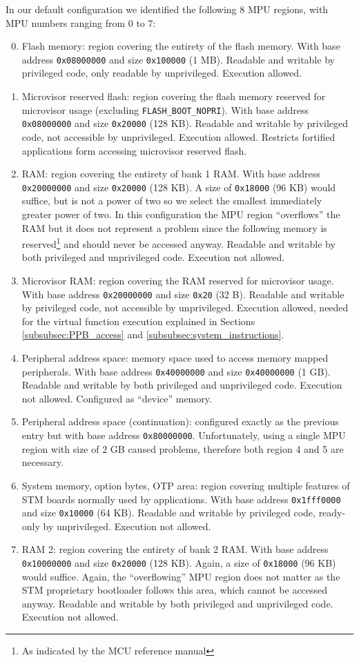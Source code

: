 \documentclass{article}
\begin{document}
In our default configuration we identified the following 8 MPU regions, with MPU numbers ranging from 0 to 7:
\begin{enumerate}
	\setcounter{enumi}{-1}
	\item Flash memory: region covering the entirety of the flash memory. With base address \verb|0x08000000| and size \verb|0x100000| (1 MB). Readable and writable by privileged code, only readable by unprivileged. Execution allowed.
	\item Microvisor reserved flash: region covering the flash memory reserved for microvisor usage (excluding \verb|FLASH_BOOT_NOPRI|). With base address \verb|0x08000000| and size \verb|0x20000| (128 KB). Readable and writable by privileged code, not accessible by unprivileged. Execution allowed. Restricts fortified applications form accessing microvisor reserved flash.
	\item RAM: region covering the entirety of bank 1 RAM. With base address \verb|0x20000000| and size \verb|0x20000| (128 KB). A size of \verb|0x18000| (96 KB) would suffice, but is not a power of two so we select the smallest immediately greater power of two. In this configuration the MPU region ``overflows'' the RAM but it does not represent a problem since the following memory is reserved\footnote{As indicated by the MCU reference manual\cite{rm0351}} and should never be accessed anyway. Readable and writable by both privileged and unprivileged code. Execution not allowed.
	\item Microvisor RAM: region covering the RAM reserved for microvisor usage. With base address \verb|0x20000000| and size \verb|0x20| (32 B). Readable and writable by privileged code, not accessible by unprivileged. Execution allowed, needed for the virtual function execution explained in Sections \ref{subsubsec:PPB_access} and \ref{subsubsec:system_instructions}.
	\item Peripheral address space: memory space used to access memory mapped peripherals. With base address \verb|0x40000000| and size \verb|0x40000000| (1 GB). Readable and writable by both privileged and unprivileged code. Execution not allowed. Configured as ``device'' memory.
	\item Peripheral address space (continuation): configured exactly as the previous entry but with base address \verb|0x80000000|. Unfortunately, using a single MPU region with size of 2 GB caused problems, therefore both region 4 and 5 are necessary.
	\item System memory, option bytes, OTP area: region covering multiple features of STM boards normally used by applications. With base address \verb|0x1fff0000| and size \verb|0x10000| (64 KB). Readable and writable by privileged code, ready-only by unprivileged. Execution not allowed.
	\item RAM 2: region covering the entirety of bank 2 RAM. With base address \verb|0x10000000| and size \verb|0x20000| (128 KB). Again, a size of \verb|0x18000| (96 KB) would suffice. Again, the ``overflowing'' MPU region does not matter as the STM proprietary bootloader follows this area, which cannot be accessed anyway. Readable and writable by both privileged and unprivileged code. Execution not allowed.
\end{enumerate}
\end{document}

